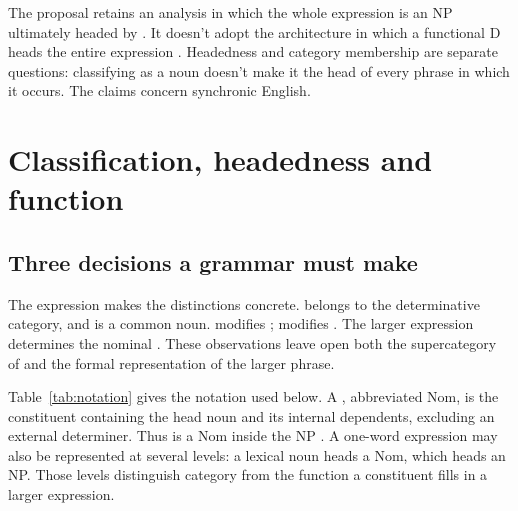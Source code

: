 \documentclass[12pt]{article}
\begin{document}
The proposal retains an analysis in which the whole expression  is an NP ultimately headed by . It doesn't adopt the architecture in which a functional D heads the entire expression \citep{abney1987}. Headedness and category membership are separate questions: classifying  as a noun doesn't make it the head of every phrase in which it occurs. The claims concern synchronic English.

\section{Classification, headedness and function}\label{sec:alternatives}

\subsection{Three decisions a grammar must make}

The expression  makes the distinctions concrete.  belongs to the determinative category, and  is a common noun.  modifies ;  modifies . The larger expression  determines the nominal . These observations leave open both the supercategory of  and the formal representation of the larger phrase.

Table~\ref{tab:notation} gives the notation used below. A , abbreviated Nom, is the constituent containing the head noun and its internal dependents, excluding an external determiner. Thus  is a Nom inside the NP . A one-word expression may also be represented at several levels: a lexical noun heads a Nom, which heads an NP. Those levels distinguish category from the function a constituent fills in a larger expression.
\end{document}
